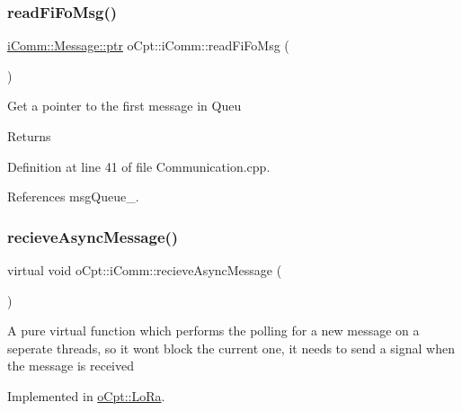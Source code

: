 \subsubsection{\texorpdfstring{read\+Fi\+Fo\+Msg()}{readFiFoMsg()}}
{\footnotesize\ttfamily \hyperlink{structo_cpt_1_1i_comm_1_1_message_ad2ba828ad76f96a30e3898b2609a4c01}{i\+Comm\+::\+Message\+::ptr} o\+Cpt\+::i\+Comm\+::read\+Fi\+Fo\+Msg (\begin{DoxyParamCaption}{ }\end{DoxyParamCaption})}

Get a pointer to the first message in Queu \begin{DoxyReturn}{Returns}

\end{DoxyReturn}


Definition at line 41 of file Communication.\+cpp.



References msg\+Queue\+\_\+.

\hypertarget{classo_cpt_1_1i_comm_a27a57fb90cfc9cce21552e8539f08dd7}{}\label{classo_cpt_1_1i_comm_a27a57fb90cfc9cce21552e8539f08dd7} 
\subsubsection{\texorpdfstring{recieve\+Async\+Message()}{recieveAsyncMessage()}}
{\footnotesize\ttfamily virtual void o\+Cpt\+::i\+Comm\+::recieve\+Async\+Message (\begin{DoxyParamCaption}{ }\end{DoxyParamCaption})\hspace{0.3cm}{\ttfamily [pure virtual]}}

A pure virtual function which performs the polling for a new message on a seperate threads, so it won\textquotesingle{}t block the current one, it needs to send a signal when the message is received 

Implemented in \hyperlink{classo_cpt_1_1_lo_ra_a6d4aa003a6ad9277998f34ee858b6264}{o\+Cpt\+::\+Lo\+Ra}.

\hypertarget{classo_cpt_1_1i_comm_a054ee0448f0d2773abce97c424c5c20c}{}\label{classo_cpt_1_1i_comm_a054ee0448f0d2773abce97c424c5c20c} 
